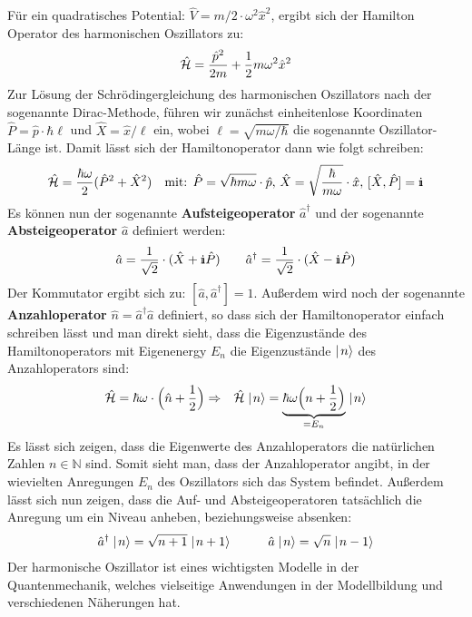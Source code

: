 Für ein quadratisches Potential: $\hat{V} = m/2\cdot\omega^2 \hat{x}^2$, ergibt sich der Hamilton Operator des harmonischen Oszillators zu:
\begin{eqnarray*}
\hat {\mathcal H} = \frac{\hat{p}^2}{2m} + \frac12 m\omega^2 \hat{x}^2
\end{eqnarray*}
Zur Lösung der Schrödingergleichung des harmonischen Oszillators nach der sogenannte Dirac-Methode, führen wir zunächst einheitenlose Koordinaten $\hat{P}=\hat{p}\cdot\hbar\ell$ und $\hat{X}=\hat{x}/\ell$ ein, wobei $\ell=\sqrt{m\omega/\hbar}$ die sogenannte Oszillator-Länge ist. Damit lässt sich der Hamiltonoperator dann wie folgt schreiben: 
\begin{eqnarray*}
	\hat{\ham} = \frac{\hbar\omega}{2} (\hat{P}^2+\hat{X}^2) \quad\text{mit: } \hat{P}=\sqrt{\hbar m\omega}\cdot\hat{p}\text{,  }\hat{X}=\sqrt{\frac {\hbar}{m \omega}}\cdot\hat{x} \text{,  }[\hat{X}, \hat{P}]=\I
\end{eqnarray*}
Es können nun der sogenannte {\bf Aufsteigeoperator} $\hat{a}^{\dagger}$ und der sogenannte {\bf Absteigeoperator} $\hat{a}$ definiert werden:
\begin{eqnarray*}
	\hat{a}=\frac1{\sqrt{2}}\cdot(\hat{X}+\I\hat{P}) &\quad& \hat{a}^{\dagger} = \frac1{\sqrt2}\cdot(\hat{X}-\I \hat{P})
\end{eqnarray*}
Der Kommutator ergibt sich zu: $[\hat{a},\hat{a}^{\dagger}]=1$. Außerdem wird noch der sogenannte {\bf Anzahloperator} $\hat{n}=\hat{a}^{\dagger}\hat{a}$ definiert, so dass sich der Hamiltonoperator einfach schreiben lässt und man direkt sieht, dass die Eigenzustände des Hamiltonoperators mit Eigenenergy $E_n$ die Eigenzustände $\mid\!\!\!\,\,{n}\rangle$ des Anzahloperators sind:
\begin{eqnarray*}
	\hat{\mathcal H}=\hbar\omega\cdot\Big(\hat{n}+\frac12\Big) &\Rightarrow& \hat{\mathcal H}\mid\!\!\!\,\,{n}\rangle=\underbrace{\hbar\omega\Big(n+\frac12\Big)}_{=E_n}\mid\!\!\!\,\,{n}\rangle
\end{eqnarray*}
Es lässt sich zeigen, dass die Eigenwerte des Anzahloperators die natürlichen Zahlen $n\in\mathbb{N}$ sind. Somit sieht man, dass der Anzahloperator angibt, in der wievielten Anregungen $E_n$ des Oszillators sich das System befindet. Außerdem lässt sich nun zeigen, dass die Auf- und Absteigeoperatoren tatsächlich die Anregung um ein Niveau anheben, beziehungsweise absenken: 
\begin{eqnarray*}
	\hat{a}^{\dagger}\ket{n} = \sqrt{n+1}\ket{n+1} &\qquad&\hat{a}\ket{n} = \sqrt{n}\ket{n-1}
\end{eqnarray*}
Der harmonische Oszillator ist eines wichtigsten Modelle in der Quantenmechanik, welches vielseitige Anwendungen in der Modellbildung und verschiedenen Näherungen hat. 



